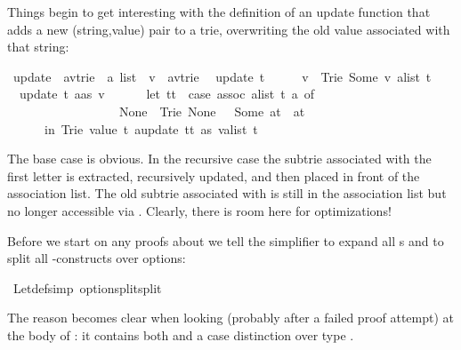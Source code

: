 \begin{isabellebody}
%
\begin{isamarkuptext}%
Things begin to get interesting with the definition of an update function
that adds a new (string,value) pair to a trie, overwriting the old value
associated with that string:%
\end{isamarkuptext}%
\ update\ {\isacharcolon}{\isacharcolon}\ {\isachardoublequote}{\isacharparenleft}{\isacharprime}a{\isacharcomma}{\isacharprime}v{\isacharparenright}trie\ {\isasymRightarrow}\ {\isacharprime}a\ list\ {\isasymRightarrow}\ {\isacharprime}v\ {\isasymRightarrow}\ {\isacharparenleft}{\isacharprime}a{\isacharcomma}{\isacharprime}v{\isacharparenright}trie{\isachardoublequote}\isanewline
{}\isanewline
\ \ {\isachardoublequote}update\ t\ {\isacharbrackleft}{\isacharbrackright}\ \ \ \ \ v\ {\isacharequal}\ Trie\ {\isacharparenleft}Some\ v{\isacharparenright}\ {\isacharparenleft}alist\ t{\isacharparenright}{\isachardoublequote}\isanewline
\ \ {\isachardoublequote}update\ t\ {\isacharparenleft}a{\isacharhash}as{\isacharparenright}\ v\ {\isacharequal}\isanewline
\ \ \ \ \ {\isacharparenleft}let\ tt\ {\isacharequal}\ {\isacharparenleft}case\ assoc\ {\isacharparenleft}alist\ t{\isacharparenright}\ a\ of\isanewline
\ \ \ \ \ \ \ \ \ \ \ \ \ \ \ \ \ \ None\ {\isasymRightarrow}\ Trie\ None\ {\isacharbrackleft}{\isacharbrackright}\ {\isacharbar}\ Some\ at\ {\isasymRightarrow}\ at{\isacharparenright}\isanewline
\ \ \ \ \ \ in\ Trie\ {\isacharparenleft}value\ t{\isacharparenright}\ {\isacharparenleft}{\isacharparenleft}a{\isacharcomma}update\ tt\ as\ v{\isacharparenright}{\isacharhash}alist\ t{\isacharparenright}{\isacharparenright}{\isachardoublequote}%
\begin{isamarkuptext}%
\noindent
The base case is obvious. In the recursive case the subtrie
 associated with the first letter  is extracted,
recursively updated, and then placed in front of the association list.
The old subtrie associated with  is still in the association list
but no longer accessible via . Clearly, there is room here for
optimizations!

Before we start on any proofs about  we tell the simplifier to
expand all s and to split all -constructs over
options:%
\end{isamarkuptext}%
\ Let{\isacharunderscore}def{\isacharbrackleft}simp{\isacharbrackright}\ option{\isachardot}split{\isacharbrackleft}split{\isacharbrackright}%
\begin{isamarkuptext}%
\noindent
The reason becomes clear when looking (probably after a failed proof
attempt) at the body of : it contains both
 and a case distinction over type .


\end{isamarkuptext}
\end{isabellebody}
